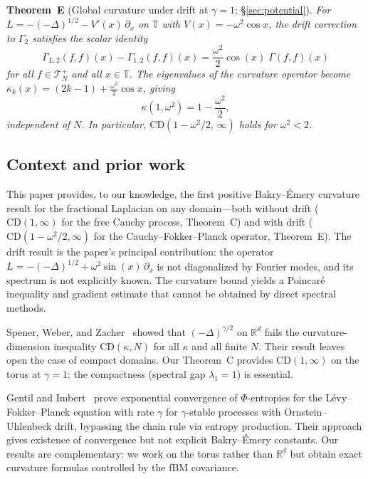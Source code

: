 \documentclass[11pt,a4paper]{article}
\theoremstyle{plain}
\theoremstyle{definition}
\theoremstyle{remark}
\newcommand{\R}{\mathbb{R}}
\newcommand{\T}{\mathbb{T}}
\begin{document}
\medskip\noindent
\textbf{Theorem~E} (Global curvature under drift at $\gamma=1$; \S\ref{sec:potential}).
\emph{For $L = -(-\Delta)^{1/2} - V'(x)\,\partial_x$ on $\T$ with
$V(x) = -\omega^2\cos x$, the drift correction to $\Gamma_2$ satisfies
the scalar identity
\begin{equation}\label{eq:intro-drift-scalar}
  \Gamma_{L,2}(f,f)(x) - \Gamma_{1,2}(f,f)(x)
  = \frac{\omega^2}{2}\cos(x)\;\Gamma(f,f)(x)
\end{equation}
for all $f \in \mathcal{T}_N^+$ and all $x \in \T$.
The eigenvalues of the curvature operator become
$\kappa_k(x) = (2k{-}1) + \frac{\omega^2}{2}\cos x$, giving
\begin{equation}\label{eq:intro-E}
  \kappa(1,\omega^2) = 1 - \frac{\omega^2}{2},
\end{equation}
independent of $N$.  In particular,
$\mathrm{CD}(1-\omega^2/2,\,\infty)$ holds for $\omega^2 < 2$.}


\subsection{Context and prior work}

This paper provides, to our knowledge, the first positive
Bakry--\'Emery curvature result for the fractional Laplacian
on any domain---both without drift ($\mathrm{CD}(1,\infty)$
for the free Cauchy process, Theorem~C) and with drift
($\mathrm{CD}(1-\omega^2/2,\infty)$ for the
Cauchy--Fokker--Planck operator, Theorem~E).
The drift result is the paper's principal contribution:
the operator $L = -(-\Delta)^{1/2} + \omega^2\sin(x)\,\partial_x$
is not diagonalized by Fourier modes, and its spectrum
is not explicitly known.  The curvature bound yields
a Poincar\'e inequality and gradient estimate that cannot
be obtained by direct spectral methods.

Spener, Weber, and Zacher~\cite{SpenerWeberZacher2020} showed that
$(-\Delta)^{\gamma/2}$ on $\R^d$ fails the curvature-dimension inequality
$\mathrm{CD}(\kappa,N)$ for all $\kappa$ and all finite $N$. Their result
leaves open the case of compact domains. Our Theorem~C provides
$\mathrm{CD}(1,\infty)$ on the torus at $\gamma = 1$: the compactness
(spectral gap $\lambda_1 = 1$) is essential.

Gentil and Imbert~\cite{GentilImbert2008} prove exponential convergence
of $\Phi$-entropies for the L\'evy--Fokker--Planck equation with rate
$\gamma$ for $\gamma$-stable processes with Ornstein--Uhlenbeck drift,
bypassing the chain rule via entropy production. Their approach gives
existence of convergence but not explicit Bakry--\'Emery constants.
Our results are complementary: we work on the torus rather than $\R^d$
but obtain exact curvature formulas controlled by the fBM covariance.
\end{document}
